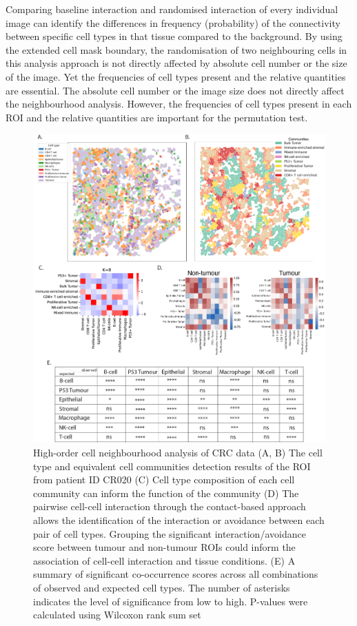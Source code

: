 Comparing baseline interaction and randomised interaction of every individual image can identify the differences in frequency (probability) of the connectivity between specific cell types in that tissue compared to the background. By using the extended cell mask boundary, the randomisation of two neighbouring cells in this analysis approach is not directly affected by absolute cell number or the size of the image. Yet the frequencies of cell types present and the relative quantities are essential. The absolute cell number or the image size does not directly affect the neighbourhood analysis. However, the frequencies of cell types present in each ROI and the relative quantities are important for the permutation test. 

\begin{figure}[hp]
    \centering
    \includegraphics[width=0.94\columnwidth]{Chapter3/Figures/Chap3_figure4_v2.png}
    \caption[High-order cell neighbourhood analysis of colorectal cancer data]{High-order cell neighbourhood analysis of CRC data (A, B) The cell type and equivalent cell communities detection results of the ROI from patient ID CR020 (C) Cell type composition of each cell community can inform the function of the community  (D) The pairwise cell-cell interaction through the contact-based approach allows the identification of the interaction or avoidance between each pair of cell types. Grouping the significant interaction/avoidance score between tumour and non-tumour ROIs could inform the association of cell-cell interaction and tissue conditions. (E) A summary of significant co-occurrence scores across all combinations of observed and expected cell types. The number of asterisks indicates the level of significance from low to high. P-values were calculated using Wilcoxon rank sum set}
    \label{fig:colorectal_cancer_IMC}
    
\end{figure}

